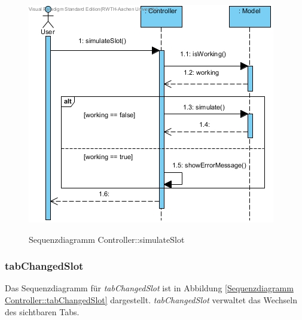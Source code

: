 \begin{figure}[H]
	\centering
	\includegraphics[scale=.6]{Bilder/Controller__simulateSlot().jpg}\\
	\caption{Sequenzdiagramm Controller::simulateSlot}
	\label{Sequenzdiagramm Controller::simulateSlot}
\end{figure}

\subsubsection*{tabChangedSlot}

Das Sequenzdiagramm für \emph{tabChangedSlot} ist in Abbildung \ref{Sequenzdiagramm Controller::tabChangedSlot} dargestellt. \emph{tabChangedSlot} verwaltet das Wechseln des sichtbaren Tabs.

